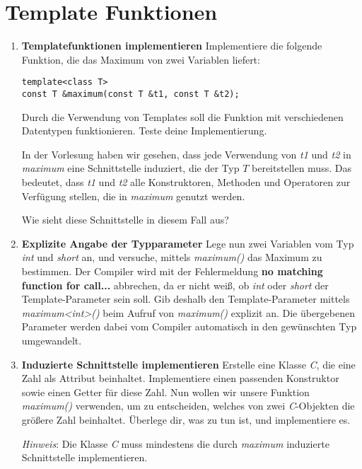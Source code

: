 \section{Template Funktionen}
\begin{enumerate}
\item \textbf{Templatefunktionen implementieren}
Implementiere die folgende Funktion, die das Maximum von zwei Variablen liefert:
\begin{lstlisting}
template<class T>
const T &maximum(const T &t1, const T &t2);
\end{lstlisting}

Durch die Verwendung von Templates soll die Funktion mit verschiedenen Datentypen funktionieren.
Teste deine Implementierung.

In der Vorlesung haben wir gesehen, dass jede Verwendung von \emph{t1} und \emph{t2} in \emph{maximum} eine Schnittstelle induziert, die der Typ $T$ bereitstellen muss.
Das bedeutet, dass \emph{t1} und \emph{t2} alle Konstruktoren, Methoden und Operatoren zur Verfügung stellen, die in \emph{maximum} genutzt werden.

Wie sieht diese Schnittstelle in diesem Fall aus?

\item \textbf{Explizite Angabe der Typparameter}
Lege nun zwei Variablen vom Typ \emph{int} und \emph{short} an, und versuche, mittels \emph{maximum()} das Maximum zu bestimmen.
Der Compiler wird mit der Fehlermeldung \textbf{no matching function for call...} abbrechen, da er nicht weiß, ob \emph{int} oder \emph{short} der Template-Parameter sein soll.
Gib deshalb den Template-Parameter mittels \emph{maximum<int>()} beim Aufruf von \emph{maximum()} explizit an.
Die übergebenen Parameter werden dabei vom Compiler automatisch in den gewünschten Typ umgewandelt.

\item \textbf{Induzierte Schnittstelle implementieren}
Erstelle eine Klasse \emph{C}, die eine Zahl als Attribut beinhaltet. Implementiere einen passenden Konstruktor sowie einen Getter für diese Zahl. Nun wollen wir unsere Funktion  \emph{maximum()} verwenden, um zu entscheiden, welches von zwei \emph{C}-Objekten die größere Zahl beinhaltet.
Überlege dir, was zu tun ist, und implementiere es. 

\emph{Hinweis}: Die Klasse \emph{C} muss mindestens die durch \emph{maximum} induzierte Schnittstelle implementieren.

\end{enumerate}


